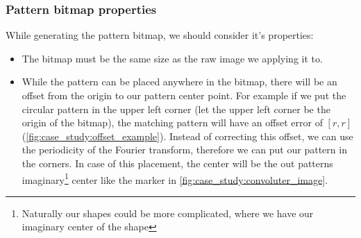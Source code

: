 \subsubsection{Pattern bitmap properties}

While generating the pattern bitmap, we should consider it's properties:
\begin{itemize}
	\item The bitmap must be the same size as the raw image we applying it to.
	\item While the pattern can be placed anywhere in the bitmap, there will be an offset from the origin to our pattern center point. For example if we put the circular pattern in the upper left corner (let the upper left corner be the origin of the bitmap), the matching pattern will have an offset error of $[r, r]$ (\cref{fig:case_study:offset_example}). Instead of correcting this offset, we can use the periodicity of the Fourier transform, therefore we can put our pattern in the corners. In case of this placement, the center will be the out patterns imaginary\footnote{Naturally our shapes could be more complicated, where we have our imaginary center of the shape} center like the marker in \cref{fig:case_study:convoluter_image}.
\end{itemize}


